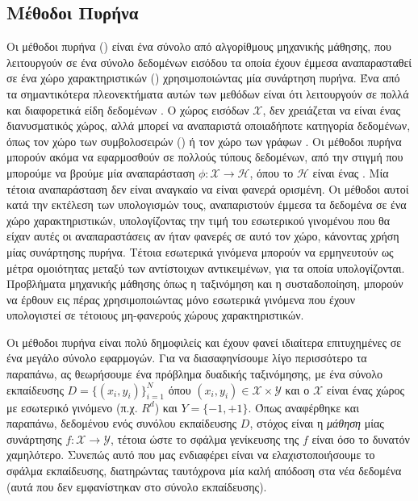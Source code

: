 \subsection{Μέθοδοι Πυρήνα}
Οι μέθοδοι πυρήνα () είναι ένα σύνολο από αλγορίθμους μηχανικής μάθησης, που λειτουργούν σε ένα σύνολο δεδομένων εισόδου τα οποία έχουν έμμεσα αναπαρασταθεί σε ένα χώρο χαρακτηριστικών () χρησιμοποιώντας μία συνάρτηση πυρήνα.
Ένα από τα σημαντικότερα πλεονεκτήματα αυτών των μεθόδων είναι ότι λειτουργούν σε πολλά και διαφορετικά είδη δεδομένων \cite{ScholkopfSmolaLK}.
Ο χώρος εισόδων $\mathcal{X}$, δεν χρειάζεται να είναι ένας διανυσματικός χώρος, αλλά μπορεί να αναπαριστά οποιαδήποτε κατηγορία δεδομένων, όπως τον χώρο των συμβολοσειρών () ή τον χώρο των γράφων \cite{GartnerSKSD}.
Οι μέθοδοι πυρήνα μπορούν ακόμα να εφαρμοσθούν σε πολλούς τύπους δεδομένων, από την στιγμή που μπορούμε να βρούμε μία αναπαράσταση $\phi : \mathcal{X} \rightarrow \mathcal{H}$, όπου το $\mathcal{H}$ είναι ένας .
Μία τέτοια αναπαράσταση δεν είναι αναγκαίο να είναι φανερά ορισμένη.
Οι μέθοδοι αυτοί κατά την εκτέλεση των υπολογισμών τους, αναπαριστούν έμμεσα τα δεδομένα σε ένα χώρο χαρακτηριστικών, υπολογίζοντας την τιμή του εσωτερικού γινομένου που θα είχαν αυτές οι αναπαραστάσεις αν ήταν φανερές σε αυτό τον χώρο, κάνοντας χρήση μίας συνάρτησης πυρήνα.
Τέτοια εσωτερικά γινόμενα μπορούν να ερμηνευτούν ως μέτρα ομοιότητας μεταξύ των αντίστοιχων αντικειμένων, για τα οποία υπολογίζονται.
Προβλήματα μηχανικής μάθησης όπως η ταξινόμηση και η συσταδοποίηση, μπορούν να έρθουν εις πέρας χρησιμοποιώντας μόνο εσωτερικά γινόμενα που έχουν υπολογιστεί σε τέτοιους μη-φανερούς χώρους χαρακτηριστικών.\par
Οι μέθοδοι πυρήνα είναι πολύ δημοφιλείς και έχουν φανεί ιδιαίτερα επιτυχημένες σε ένα μεγάλο σύνολο εφαρμογών.
Για να διασαφηνίσουμε λίγο περισσότερο τα παραπάνω, ας θεωρήσουμε ένα πρόβλημα δυαδικής ταξινόμησης, με ένα σύνολο εκπαίδευσης $D = \{( x_{i}, y_{i})\}^{Ν}_{i = 1}$ όπου $(x_{i}, y_{i}) \in \mathcal{X} \times \mathcal{Y}$ και ο $\mathcal{X}$ είναι ένας χώρος με εσωτερικό γινόμενο (π.χ. $R^{d}$) και $Y = \{-1, +1\}$.
Όπως αναφέρθηκε και παραπάνω, δεδομένου ενός συνόλου εκπαίδευσης $D$, στόχος είναι η \textit{μάθηση} μίας συνάρτησης $f : \mathcal{X} \rightarrow \mathcal{Y}$, τέτοια ώστε το σφάλμα γενίκευσης της $f$ είναι όσο το δυνατόν χαμηλότερο.
Συνεπώς αυτό που μας ενδιαφέρει είναι να ελαχιστοποιήσουμε το σφάλμα εκπαίδευσης, διατηρώντας ταυτόχρονα μία καλή απόδοση στα νέα δεδομένα (αυτά που δεν εμφανίστηκαν στο σύνολο εκπαίδευσης).
